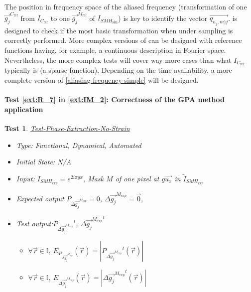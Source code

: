 \documentclass[12pt, titlepage]{article}
\newtheorem{Test}{Test}
\begin{document}
The position in frequency space of the aliased frequency (transformation of one $\overrightarrow{g_{j}}^{C_{\text{ref}}}$ from $I_{C_{\text{ref}}}$ to one $\overrightarrow{g_{j}}^{M_{\text{ref}}}$ of $I_{\mathit{SMH}_{\text{sim}}}$) is key to identify the vector $\overrightarrow{q_{n_j,m)j}}$.  is designed to check if the most basic transformation when under sampling is correctly performed. More complex versions of  can be designed with reference functions having, for example, a continuous description in Fourier space. Nevertheless, the more complex tests will cover way more cases than what $I_{C_{\text{ref}}}$ typically is (a sparse function). Depending on the time availability, a more complete version of \cref{aliasing-frequency-simple} will be designed.
		
\paragraph{Test \cref{ext:R_7} in \cref{ext:IM_2}: Correctness of the GPA method application} 

\begin{Test}\normalfont\underline{Test-Phase-Extraction-No-Strain}
\label{T_Phase-Extraction-No-Strain}
\begin{itemize}
\item Type: Functional, Dynamical, Automated
\item Initial State: N/A
\item Input: $I_{SMH_{exp}}=e^{2i\pi gx}$, Mask $M$ of one pixel at $g\overrightarrow{u_x}$ in $\widetilde{I}_{SMH_{exp}}$
\item Expected output $P_{\Delta \overrightarrow{g_{j}}^{M_{exp}}}=0$, $\Delta \overrightarrow{g_{j}}^{M_{exp}}=\overrightarrow{0}$, 
\item Test output:${P_{\Delta \overrightarrow{g_{j}}^{M_{exp}}}}^{t}$, $\Delta {\overrightarrow{g_{j}}^{M_{exp}}}^{t}$
	\begin{itemize}
	\item $\forall \vec{r} \in \mathbb{I}, \ E_{P_{\Delta \overrightarrow{g_{j}}^{M_{exp}}}}(\vec{r})=|{P_{\Delta \overrightarrow{g_{j}}^{M_{exp}}}}^{t}(\vec{r})|$
	\item $\forall \vec{r} \in \mathbb{I}, \ E_{\Delta {\overrightarrow{g_{j}}^{M_{exp}}}}(\vec{r})=|{\Delta {\overrightarrow{g_{j}}^{M_{exp}}}}^t(\vec{r})|$
	\end{itemize}  
\end{itemize}
\end{Test}
\end{document}
